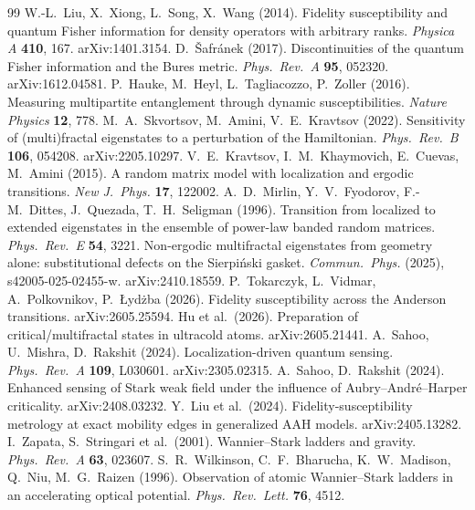 \documentclass[11pt]{article}
\begin{document}
\begin{thebibliography}{99}
\footnotesize
{} W.-L.~Liu, X.~Xiong, L.~Song, X.~Wang (2014). Fidelity susceptibility and quantum
Fisher information for density operators with arbitrary ranks. \emph{Physica A} \textbf{410}, 167.
arXiv:1401.3154.
 D.~\v{S}afr\'anek (2017). Discontinuities of the quantum Fisher information
and the Bures metric. \emph{Phys.\ Rev.\ A} \textbf{95}, 052320. arXiv:1612.04581.
 P.~Hauke, M.~Heyl, L.~Tagliacozzo, P.~Zoller (2016). Measuring multipartite
entanglement through dynamic susceptibilities. \emph{Nature Physics} \textbf{12}, 778.
 M.~A.~Skvortsov, M.~Amini, V.~E.~Kravtsov (2022). Sensitivity of (multi)fractal
eigenstates to a perturbation of the Hamiltonian. \emph{Phys.\ Rev.\ B} \textbf{106}, 054208.
arXiv:2205.10297.
 V.~E.~Kravtsov, I.~M.~Khaymovich, E.~Cuevas, M.~Amini (2015). A random
matrix model with localization and ergodic transitions. \emph{New J.\ Phys.} \textbf{17}, 122002.
 A.~D.~Mirlin, Y.~V.~Fyodorov, F.-M.~Dittes, J.~Quezada, T.~H.~Seligman
(1996). Transition from localized to extended eigenstates in the ensemble of power-law banded
random matrices. \emph{Phys.\ Rev.\ E} \textbf{54}, 3221.
 Non-ergodic multifractal eigenstates from geometry alone: substitutional
defects on the Sierpi\'nski gasket. \emph{Commun.\ Phys.} (2025), s42005-025-02455-w.
arXiv:2410.18559.
 P.~Tokarczyk, L.~Vidmar, A.~Polkovnikov, P.~\L{}yd\.zba (2026). Fidelity
susceptibility across the Anderson transitions. arXiv:2605.25594.
 Hu et al.\ (2026). Preparation of critical/multifractal states in ultracold
atoms. arXiv:2605.21441.
 A.~Sahoo, U.~Mishra, D.~Rakshit (2024). Localization-driven quantum sensing.
\emph{Phys.\ Rev.\ A} \textbf{109}, L030601. arXiv:2305.02315.
 A.~Sahoo, D.~Rakshit (2024). Enhanced sensing of Stark weak field under the
influence of Aubry--Andr\'e--Harper criticality. arXiv:2408.03232.
 Y.~Liu et al.\ (2024). Fidelity-susceptibility metrology at exact mobility
edges in generalized AAH models. arXiv:2405.13282.
 I.~Zapata, S.~Stringari et al.\ (2001). Wannier--Stark ladders and gravity.
\emph{Phys.\ Rev.\ A} \textbf{63}, 023607.
 S.~R.~Wilkinson, C.~F.~Bharucha, K.~W.~Madison, Q.~Niu, M.~G.~Raizen
(1996). Observation of atomic Wannier--Stark ladders in an accelerating optical potential.
\emph{Phys.\ Rev.\ Lett.} \textbf{76}, 4512.

\end{thebibliography}
\end{document}
